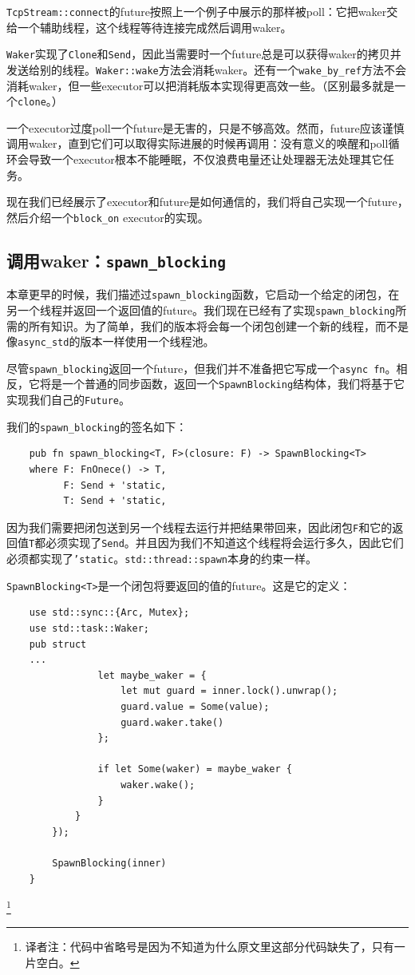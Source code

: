 \texttt{TcpStream::connect}的future按照上一个例子中展示的那样被poll：它把waker交给一个辅助线程，这个线程等待连接完成然后调用waker。

\texttt{Waker}实现了\texttt{Clone}和\texttt{Send}，因此当需要时一个future总是可以获得waker的拷贝并发送给别的线程。\texttt{Waker::wake}方法会消耗waker。还有一个\texttt{wake\_by\_ref}方法不会消耗waker，但一些executor可以把消耗版本实现得更高效一些。（区别最多就是一个\texttt{clone}。）

一个executor过度poll一个future是无害的，只是不够高效。然而，future应该谨慎调用waker，直到它们可以取得实际进展的时候再调用：没有意义的唤醒和poll循环会导致一个executor根本不能睡眠，不仅浪费电量还让处理器无法处理其它任务。

现在我们已经展示了executor和future是如何通信的，我们将自己实现一个future，然后介绍一个\texttt{block\_on} executor的实现。

\subsection{调用waker：\texttt{spawn\_blocking}}
本章更早的时候，我们描述过\texttt{spawn\_blocking}函数，它启动一个给定的闭包，在另一个线程并返回一个返回值的future。我们现在已经有了实现\texttt{spawn\_blocking}所需的所有知识。为了简单，我们的版本将会每一个闭包创建一个新的线程，而不是像\texttt{async\_std}的版本一样使用一个线程池。

尽管\texttt{spawn\_blocking}返回一个future，但我们并不准备把它写成一个\texttt{async fn}。相反，它将是一个普通的同步函数，返回一个\texttt{SpawnBlocking}结构体，我们将基于它实现我们自己的\texttt{Future}。

我们的\texttt{spawn\_blocking}的签名如下：
\begin{verbatim}
    pub fn spawn_blocking<T, F>(closure: F) -> SpawnBlocking<T>
    where F: FnOnece() -> T,
          F: Send + 'static,
          T: Send + 'static,
\end{verbatim}

因为我们需要把闭包送到另一个线程去运行并把结果带回来，因此闭包\texttt{F}和它的返回值\texttt{T}都必须实现了\texttt{Send}。并且因为我们不知道这个线程将会运行多久，因此它们必须都实现了\texttt{'static}。\texttt{std::thread::spawn}本身的约束一样。

\texttt{SpawnBlocking<T>}是一个闭包将要返回的值的future。这是它的定义：
\begin{verbatim}
    use std::sync::{Arc, Mutex};
    use std::task::Waker;
    pub struct
    ...
                let maybe_waker = {
                    let mut guard = inner.lock().unwrap();
                    guard.value = Some(value);
                    guard.waker.take()
                };

                if let Some(waker) = maybe_waker {
                    waker.wake();
                }
            }
        });

        SpawnBlocking(inner)
    }
\end{verbatim}
\footnote{译者注：代码中省略号是因为不知道为什么原文里这部分代码缺失了，只有一片空白。}

